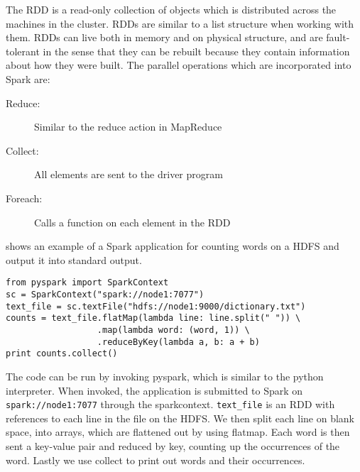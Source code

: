 The RDD is a read-only collection of objects which is distributed across the machines in the cluster. RDDs are similar to a list structure when working with them. RDDs can live both in memory and on physical structure, and are fault-tolerant in the sense that they can be rebuilt because they contain information about how they were built. The parallel operations which are incorporated into Spark are: 
\begin{description}
  \item[Reduce:] Similar to the reduce action in MapReduce 
  \item[Collect:] All elements are sent to the driver program
  \item[Foreach:] Calls a function on each element in the RDD
\end{description}
 shows an example of a Spark application for counting words on a HDFS and output it into standard output.
\begin{lstlisting}[caption={Wordcount in Spark on HDFS},label={lst:wordcount},belowcaptionskip=4pt]
from pyspark import SparkContext
sc = SparkContext("spark://node1:7077")
text_file = sc.textFile("hdfs://node1:9000/dictionary.txt")
counts = text_file.flatMap(lambda line: line.split(" ")) \
                  .map(lambda word: (word, 1)) \
                  .reduceByKey(lambda a, b: a + b)
print counts.collect()
\end{lstlisting} 
The code can be run by invoking pyspark, which is similar to the python interpreter. When invoked, the application is submitted to Spark on \texttt{spark://node1:7077} through the sparkcontext. \texttt{text\_file} is an RDD with references to each line in the file on the HDFS. We then split each line on blank space, into arrays, which are flattened out by using flatmap. Each word is then sent a key-value pair and reduced by key, counting up the occurrences of the word. Lastly we use collect to print out words and their occurrences.





